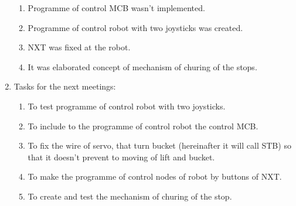 \begin{enumerate}
\begin{enumerate}
		\item Programme of control MCB wasn't implemented.
		
		\item Programme of control robot with two joysticks was created.
		
		\item NXT was fixed at the robot.
		
		\item It was elaborated concept of mechanism of churing of the stops.
		
	\end{enumerate}
	
	\item Tasks for the next meetings:
	\begin{enumerate}
		\item To test programme of control robot with two joysticks.
		
		\item To include to the programme of control robot  the control MCB.
		
		\item To fix the wire of servo, that turn bucket (hereinafter it will call STB) so that it doesn't prevent to moving of lift and bucket.
		
		\item To make the programme of control nodes of robot by buttons of NXT.
		
		\item To create and test the mechanism of churing of the stop.
		
	\end{enumerate}     
\end{enumerate}
\fillpage

